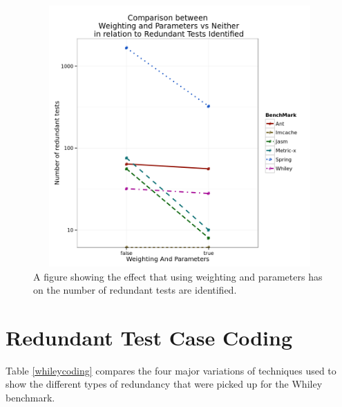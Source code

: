 \begin{figure}[h]
\begin{center}
\includegraphics[height=10cm, width = 14.5cm]{WeightNParam.png}
\end{center}
\caption{A figure showing the effect that using weighting and parameters has on the number of redundant tests are identified.}
\label{fig:weightingparamgraph}
\end{figure}

\section{Redundant Test Case Coding}

Table \ref{whileycoding} compares the four major variations of techniques used to show the different types of redundancy that were picked up for the Whiley benchmark. 


